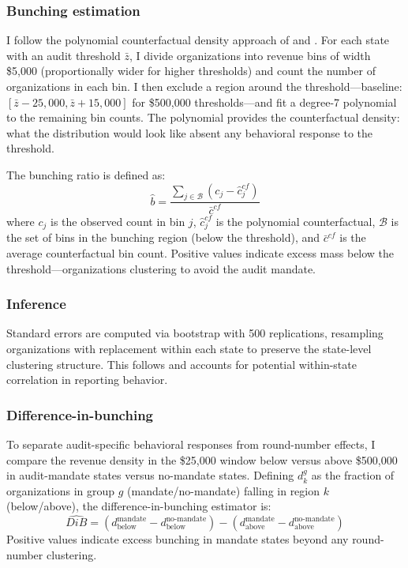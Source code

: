 \documentclass[12pt]{article}
\begin{document}
\subsubsection*{Bunching estimation} I follow the polynomial counterfactual density approach of \citet{Kleven2013} and \citet{Chetty2011}. For each state with an audit threshold $\bar{z}$, I divide organizations into revenue bins of width \$5,000 (proportionally wider for higher thresholds) and count the number of organizations in each bin. I then exclude a region around the threshold---baseline: $[\bar{z} - 25{,}000, \bar{z} + 15{,}000]$ for \$500,000 thresholds---and fit a degree-7 polynomial to the remaining bin counts. The polynomial provides the counterfactual density: what the distribution would look like absent any behavioral response to the threshold.

The bunching ratio is defined as:
\begin{equation}
\hat{b} = \frac{\sum_{j \in \mathcal{B}} (c_j - \hat{c}_j^{cf})}{\bar{c}^{cf}}
\label{eq:bunching}
\end{equation}
where $c_j$ is the observed count in bin $j$, $\hat{c}_j^{cf}$ is the polynomial counterfactual, $\mathcal{B}$ is the set of bins in the bunching region (below the threshold), and $\bar{c}^{cf}$ is the average counterfactual bin count. Positive values indicate excess mass below the threshold---organizations clustering to avoid the audit mandate.

\subsubsection*{Inference} Standard errors are computed via bootstrap with 500 replications, resampling organizations with replacement within each state to preserve the state-level clustering structure. This follows \citet{Kleven2013} and accounts for potential within-state correlation in reporting behavior.

\subsubsection*{Difference-in-bunching} To separate audit-specific behavioral responses from round-number effects, I compare the revenue density in the \$25,000 window below versus above \$500,000 in audit-mandate states versus no-mandate states. Defining $d^{g}_{k}$ as the fraction of organizations in group $g$ (mandate/no-mandate) falling in region $k$ (below/above), the difference-in-bunching estimator is:
\begin{equation}
\widehat{DiB} = (d^{\text{mandate}}_{\text{below}} - d^{\text{no-mandate}}_{\text{below}}) - (d^{\text{mandate}}_{\text{above}} - d^{\text{no-mandate}}_{\text{above}})
\label{eq:dib}
\end{equation}
Positive values indicate excess bunching in mandate states beyond any round-number clustering.
\end{document}
